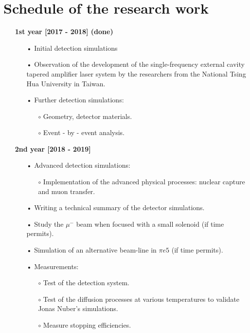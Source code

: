 \documentclass[12pt]{article}
\begin{document}
\section{Schedule of the research work}
\begin{itemize}
\item[]
\textbf{1st year [2017 - 2018] (done)}
\begin{itemize}
\item[•]
	Initial detection simulations
\item[•]
	Observation of the development of the single-frequency external cavity tapered amplifier laser system by the researchers from the National Tsing Hua University in Taiwan. 	
\item[•]
	Further detection simulations:
	\begin{itemize}
		\item[$\circ$]
		Geometry, detector materials.
		\item[$\circ$]
		Event - by - event analysis.	
	\end{itemize}
\end{itemize}
\item[]
\textbf{2nd year [2018 - 2019]}
\begin{itemize}
\item[•]	
    Advanced detection simulations:
    \begin{itemize}
    		\item[$\circ$]
    		Implementation of the advanced physical processes: nuclear capture and muon transfer.
    \end{itemize}
\item[•]
    Writing a technical summary of the detector simulations. 
\item[•]    
	Study the $\mu^{-}$ beam when focused with a small solenoid (if time permits). 
\item[•]
	Simulation of an alternative beam-line in $\pi{e}5$ (if time permits).	 
\item[•]
    Measurements:
    \begin{itemize}
    \item[$\circ$]
	Test of the detection system.
	\item[$\circ$]
	Test of the diffusion processes at various temperatures to validate Jonas Nuber's simulations. 
	\item[$\circ$]
	Measure stopping efficiencies.
	\end{itemize}

\end{itemize}
\end{itemize}
\end{document}
